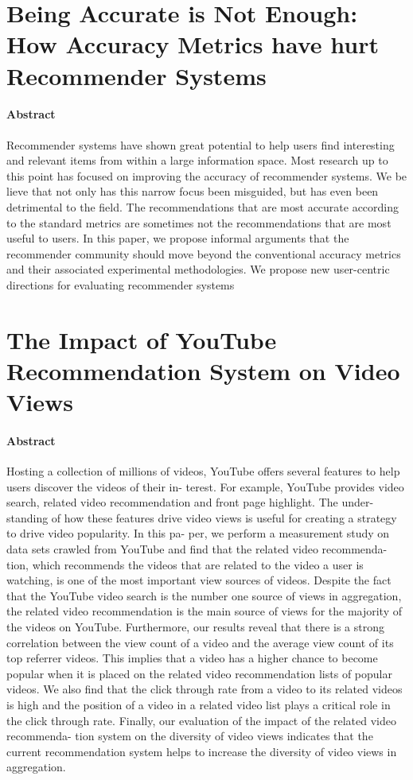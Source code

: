 \documentclass[oneside]{book}
\begin{document}
\section{Being Accurate is Not Enough: How Accuracy Metrics have hurt Recommender Systems }
\paragraph{Abstract}
Recommender systems have shown great potential to 
help users find interesting and relevant items from 
within a large information space.  Most research up to 
this point has focused on improving the accuracy of 
recommender systems.  We be
lieve that not only has 
this narrow focus been misguided, but has even been 
detrimental to the field.  The recommendations that are 
most accurate according to the standard metrics are 
sometimes not the recommendations that are most 
useful to users. In this paper, we propose informal 
arguments that the recommender community should 
move beyond the conventional accuracy metrics and 
their associated experimental methodologies.  We 
propose new user-centric directions for evaluating 
recommender systems
\section{The Impact of YouTube Recommendation System on Video Views}
\paragraph{Abstract}
Hosting a collection of millions of videos, YouTube offers
several features to help users discover the videos of their in-
terest. For example, YouTube provides video search, related
video recommendation and front page highlight. The under-
standing of how these features drive video views is useful for
creating a strategy to drive video popularity.  In this pa-
per, we perform a measurement study on data sets crawled
from YouTube and find that the related video recommenda-
tion, which recommends the videos that are related to the
video a user is watching, is one of the most important view
sources of videos. Despite the fact that the YouTube video
search is the number one source of views in aggregation, the
related video recommendation is the main source of views
for the majority of the videos on YouTube. Furthermore,
our results reveal that there is a strong correlation between
the view count of a video and the average view count of its
top referrer videos. This implies that a video has a higher
chance to become popular when it is placed on the related
video recommendation lists of popular videos. We also find
that the click through rate from a video to its related videos
is high and the position of a video in a related video list
plays a critical role in the click through rate. Finally, our
evaluation of the impact of the related video recommenda-
tion system on the diversity of video views indicates that
the current recommendation system helps to increase the
diversity of video views in aggregation.
\end{document}

